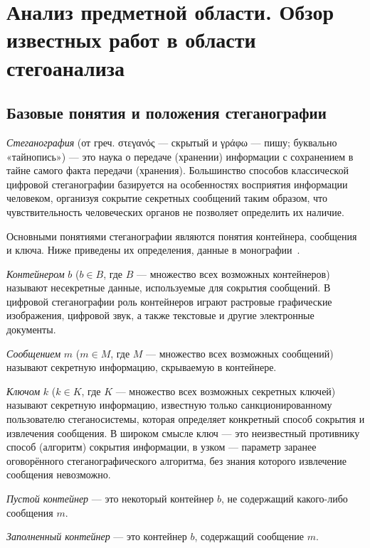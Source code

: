 
\section{Анализ предметной области. Обзор известных работ в области стегоанализа}

\subsection{Базовые понятия и положения стеганографии}

\textit{Стеганография} (от греч. στεγανός — скрытый и γράφω — пишу; буквально «тайнопись») — это наука о передаче (хранении) информации с сохранением в тайне самого факта передачи (хранения). Большинство способов классической цифровой стеганографии базируется на особенностях восприятия информации человеком, организуя сокрытие секретных сообщений таким образом, что чувствительность человеческих органов не позволяет определить их наличие.

Основными понятиями стеганографии являются понятия контейнера, сообщения и ключа. Ниже приведены их определения, данные в монографии~\cite{Agranovskiy}.

\textit{Контейнером} $ b $ ($ b \in B $, где $ B $ — множество всех возможных контейнеров) называют несекретные данные, используемые для сокрытия сообщений. В цифровой стеганографии роль контейнеров играют растровые графические изображения, цифровой звук, а также текстовые и другие электронные документы.

\textit{Сообщением} $ m $ ($ m \in M $, где $ M $ — множество всех возможных сообщений) называют секретную информацию, скрываемую в контейнере.

\textit{Ключом} $ k $ ($ k \in K $, где $ K $ — множество всех возможных секретных ключей) называют секретную информацию, известную только санкционированному пользователю стеганосистемы, которая определяет конкретный способ сокрытия и извлечения сообщения. В широком смысле ключ — это неизвестный противнику способ (алгоритм) сокрытия информации, в узком — параметр заранее оговорённого стеганографического алгоритма, без знания которого извлечение сообщения невозможно.

\textit{Пустой контейнер} --- это некоторый контейнер $ b $, не содержащий какого-либо сообщения $ m $.

\textit{Заполненный контейнер} --- это контейнер $ b $, содержащий сообщение $ m $.

